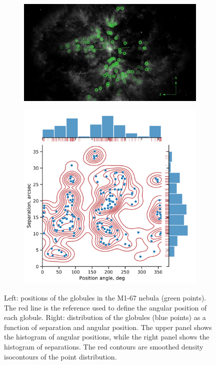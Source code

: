 \documentclass{book}
\begin{document}
\begin{figure}[htb]
    \centering  
    \begin{subfigure}[b]{0.45\linewidth}
        \includegraphics[width=\textwidth]{ultimas correcciones/M167_glo.pdf}
    \end{subfigure}
    \begin{subfigure}[b]{0.45\linewidth}
        \includegraphics[width=\textwidth]{images Chapter 2/C2_nudos_distribucion.png}
    \end{subfigure}
    \caption{Left: positions of the globules in the M1-67 nebula (green
      points). The red line is the reference used to define the
      angular position of each globule. Right: distribution of the
      globules (blue points) as a function of separation and angular
      position. The upper panel shows the histogram of angular
      positions, while the right panel shows the histogram of
      separations. The red contours are smoothed density isocontours
      of the point distribution.}
    \label{fig:dis_nudos}
\end{figure}
\end{document}
